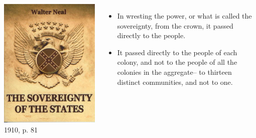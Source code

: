 \begin{frame}
    \begin{columns}[onlytextwidth]
            \centering
            \includegraphics[height=0.75\textheight]{img/walter-neal-book.jpg} \\
            1910,  p. 81\\

            \begin{itemize}
                \item In wresting the power, or what is called the sovereignty, from the crown, it passed directly to the people.
                \item It passed directly to the people of each colony, and not to the people of all the colonies in the aggregate– to thirteen distinct communities, and not to one.
            \end{itemize}
    \end{columns}
\end{frame}

